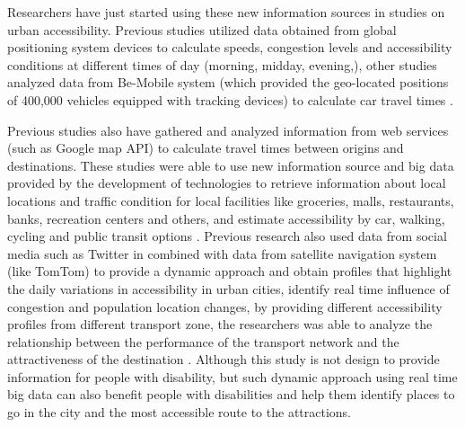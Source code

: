 Researchers have just started  using these new information sources in 
studies on urban accessibility. Previous studies utilized data obtained from 
global positioning system devices to calculate speeds, congestion levels and 
accessibility conditions at  different times of day (morning, midday, evening,),
other studies analyzed data from Be-Mobile system (which provided the geo-located 
positions of 400,000 vehicles equipped with tracking devices) to calculate car 
travel times \cite{moya2016dynamic}. 

Previous studies also have gathered and analyzed information from web services 
(such as Google map API) to calculate travel times between origins and destinations. 
These studies were able to use new information source and big data provided by the 
development of technologies to retrieve information about local locations and traffic 
condition for local facilities like groceries, malls, restaurants, banks, recreation 
centers and others, and estimate accessibility by car, walking, cycling and public 
transit options \cite{moya2016dynamic}. Previous research also used data from social 
media such as Twitter in combined with data from satellite navigation system (like TomTom) 
to provide a dynamic approach and obtain profiles that highlight the daily variations 
in accessibility in urban cities, identify real time influence of congestion and 
population location changes, by providing different accessibility profiles from 
different transport zone, the researchers was able to analyze the relationship between 
the performance of the transport network and the attractiveness of the destination 
\cite{moya2016dynamic}. Although this study is not design to provide information for 
people with disability, but such dynamic approach using real time big data can also 
benefit people with disabilities and help them identify places to go in the city and 
the most accessible route to the attractions. 


